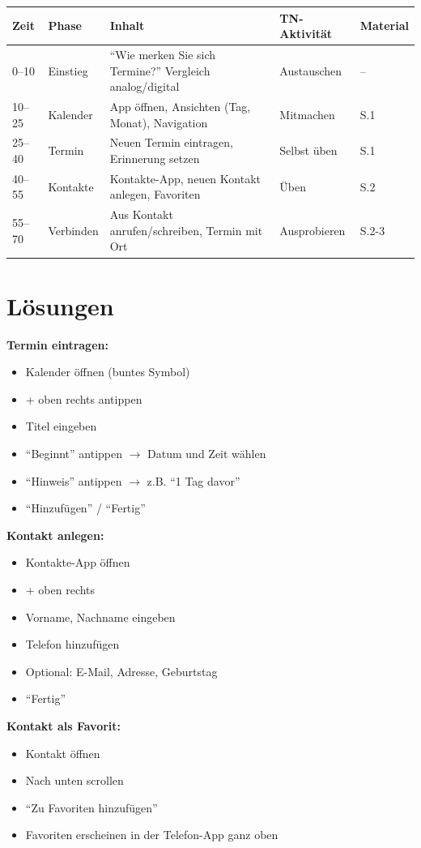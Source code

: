 \documentclass[11pt,a4paper]{article}
\begin{document}
\begin{longtable}{|p{1cm}|p{2cm}|p{5cm}|p{3cm}|p{2cm}|}
\hline
\textbf{Zeit} & \textbf{Phase} & \textbf{Inhalt} & \textbf{TN-Aktivität} & \textbf{Material} \\
\hline
0--10 & Einstieg & ``Wie merken Sie sich Termine?'' Vergleich analog/digital & Austauschen & -- \\
\hline
10--25 & Kalender & App öffnen, Ansichten (Tag, Monat), Navigation & Mitmachen & S.1 \\
\hline
25--40 & Termin & Neuen Termin eintragen, Erinnerung setzen & Selbst üben & S.1 \\
\hline
40--55 & Kontakte & Kontakte-App, neuen Kontakt anlegen, Favoriten & Üben & S.2 \\
\hline
55--70 & Verbinden & Aus Kontakt anrufen/schreiben, Termin mit Ort & Ausprobieren & S.2-3 \\
\hline
\end{longtable}

\section{Lösungen}

\textbf{Termin eintragen:}
\begin{itemize}
    \item Kalender öffnen (buntes Symbol)
    \item + oben rechts antippen
    \item Titel eingeben
    \item ``Beginnt'' antippen $\rightarrow$ Datum und Zeit wählen
    \item ``Hinweis'' antippen $\rightarrow$ z.B. ``1 Tag davor''
    \item ``Hinzufügen'' / ``Fertig''
\end{itemize}

\textbf{Kontakt anlegen:}
\begin{itemize}
    \item Kontakte-App öffnen
    \item + oben rechts
    \item Vorname, Nachname eingeben
    \item Telefon hinzufügen
    \item Optional: E-Mail, Adresse, Geburtstag
    \item ``Fertig''
\end{itemize}

\textbf{Kontakt als Favorit:}
\begin{itemize}
    \item Kontakt öffnen
    \item Nach unten scrollen
    \item ``Zu Favoriten hinzufügen''
    \item Favoriten erscheinen in der Telefon-App ganz oben
\end{itemize}
\end{document}
